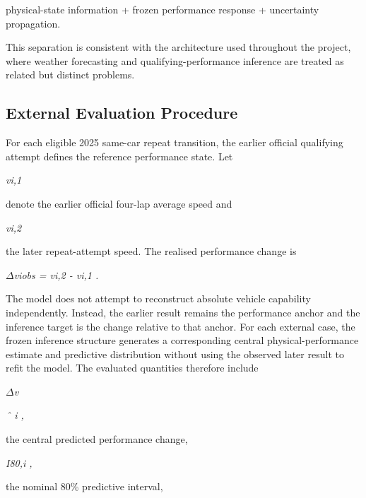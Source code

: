 physical-state information + frozen performance response + uncertainty propagation.

This separation is consistent with the architecture used throughout the project, where weather forecasting and qualifying-performance inference are treated as related but distinct problems.

\subsection{External Evaluation Procedure}
For each eligible 2025 same-car repeat transition, the earlier official qualifying attempt defines the reference performance state. Let

\begin{center}\textit{vi,1}\end{center}

denote the earlier official four-lap average speed and

\begin{center}\textit{vi,2}\end{center}

the later repeat-attempt speed. The realised performance change is

\begin{center}\textit{\ensuremath{\Delta}viobs = vi,2 - vi,1 .}\end{center}

The model does not attempt to reconstruct absolute vehicle capability independently. Instead, the earlier result remains the performance anchor and the inference target is the change relative to that anchor. For each external case, the frozen inference structure generates a corresponding central physical-performance estimate and predictive distribution without using the observed later result to refit the model. The evaluated quantities therefore include

\begin{center}\textit{\ensuremath{\Delta}v}\end{center}

\begin{center}\textit{ˆ i ,}\end{center}

the central predicted performance change,

\begin{center}\textit{I80,i ,}\end{center}

the nominal 80\% predictive interval,

